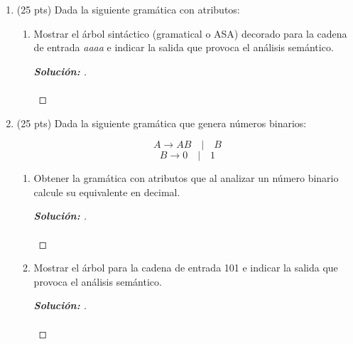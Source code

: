 \documentclass{article}
\begin{document}
\begin{enumerate}
  \item (25 pts) Dada la siguiente gramática con atributos:
  \begin{enumerate}
      \item Mostrar el árbol sintáctico (gramatical o ASA) decorado para la cadena de entrada \textit{aaaa} e indicar la salida que provoca el análisis semántico.
      \begin{proof}[\textbf{Solución: }]
        \quad \\ \\
      \end{proof}
  \end{enumerate}

  \item (25 pts) Dada la siguiente gramática que genera números binarios:

  $$ A \rightarrow AB \quad | \quad B$$
  $$ B \rightarrow 0 \quad | \quad 1$$

  \begin{enumerate}
      \item Obtener la gramática con atributos que al analizar un número binario calcule su equivalente en decimal.
      \begin{proof}[\textbf{Solución: }]
        \quad \\ \\
      \end{proof}
      
      \item Mostrar el árbol para la cadena de entrada 101 e indicar la salida que provoca el análisis semántico.
      \begin{proof}[\textbf{Solución: }]
        \quad \\ \\
      \end{proof}
  \end{enumerate}
\end{enumerate}
\end{document}

